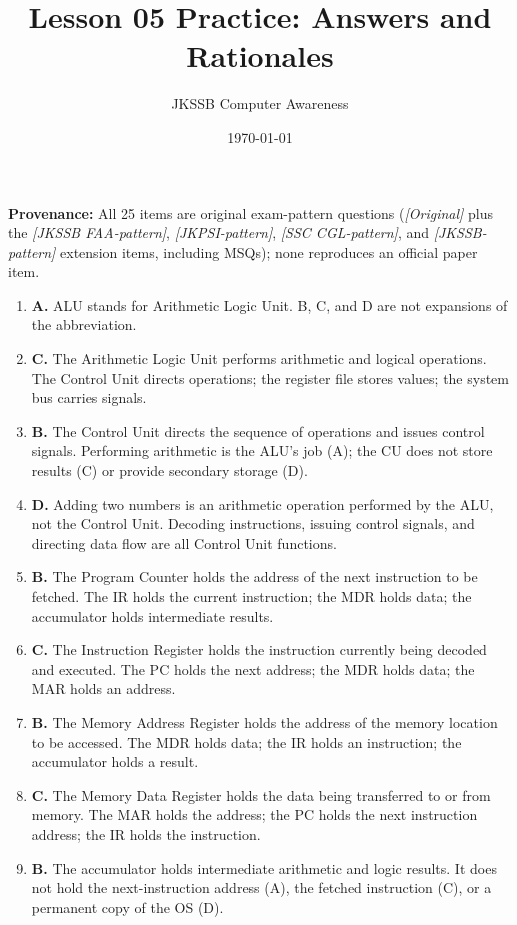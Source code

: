 \documentclass[11pt]{article}
\title{Lesson 05 Practice: Answers and Rationales}
\author{JKSSB Computer Awareness}
\date{\today}
\begin{document}
\maketitle
\noindent\textbf{Provenance:} All 25 items are original exam-pattern questions (\textit{[Original]} plus the \textit{[JKSSB FAA-pattern]}, \textit{[JKPSI-pattern]}, \textit{[SSC CGL-pattern]}, and \textit{[JKSSB-pattern]} extension items, including MSQs); none reproduces an official paper item.
\begin{enumerate}[label=\textbf{Q\arabic*.}, leftmargin=*]
\item \textbf{A.} ALU stands for Arithmetic Logic Unit. B, C, and D are not
  expansions of the abbreviation.
\item \textbf{C.} The Arithmetic Logic Unit performs arithmetic and logical
  operations. The Control Unit directs operations; the register file stores
  values; the system bus carries signals.
\item \textbf{B.} The Control Unit directs the sequence of operations and
  issues control signals. Performing arithmetic is the ALU's job (A); the
  CU does not store results (C) or provide secondary storage (D).
\item \textbf{D.} Adding two numbers is an arithmetic operation performed by
  the ALU, not the Control Unit. Decoding instructions, issuing control
  signals, and directing data flow are all Control Unit functions.
\item \textbf{B.} The Program Counter holds the address of the next
  instruction to be fetched. The IR holds the current instruction; the MDR
  holds data; the accumulator holds intermediate results.
\item \textbf{C.} The Instruction Register holds the instruction currently
  being decoded and executed. The PC holds the next address; the MDR holds
  data; the MAR holds an address.
\item \textbf{B.} The Memory Address Register holds the address of the memory
  location to be accessed. The MDR holds data; the IR holds an instruction;
  the accumulator holds a result.
\item \textbf{C.} The Memory Data Register holds the data being transferred
  to or from memory. The MAR holds the address; the PC holds the next
  instruction address; the IR holds the instruction.
\item \textbf{B.} The accumulator holds intermediate arithmetic and logic
  results. It does not hold the next-instruction address (A), the fetched
  instruction (C), or a permanent copy of the OS (D).

\end{enumerate}
\end{document}

